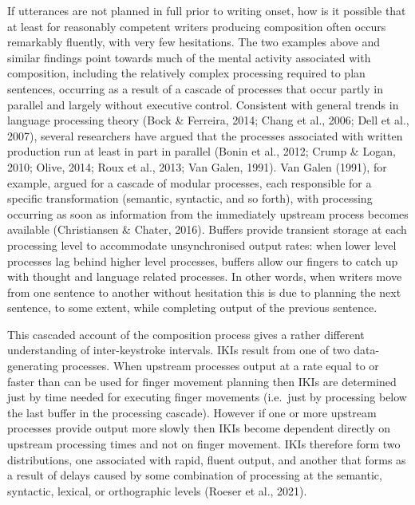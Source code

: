 \documentclass[
  english,
  man,floatsintext]{apa7}
\begin{document}
If utterances are not planned in full prior to writing onset, how is it possible that at least for reasonably competent writers producing composition often occurs remarkably fluently, with very few hesitations. The two examples above and similar findings point towards much of the mental activity associated with composition, including the relatively complex processing required to plan sentences, occurring as a result of a cascade of processes that occur partly in parallel and largely without executive control. Consistent with general trends in language processing theory (Bock \& Ferreira, 2014; Chang et al., 2006; Dell et al., 2007), several researchers have argued that the processes associated with written production run at least in part in parallel (Bonin et al., 2012; Crump \& Logan, 2010; Olive, 2014; Roux et al., 2013; Van Galen, 1991). Van Galen (1991), for example, argued for a cascade of modular processes, each responsible for a specific transformation (semantic, syntactic, and so forth), with processing occurring as soon as information from the immediately upstream process becomes available (Christiansen \& Chater, 2016). Buffers provide transient storage at each processing level to accommodate unsynchronised output rates: when lower level processes lag behind higher level processes, buffers allow our fingers to catch up with thought and language related processes. In other words, when writers move from one sentence to another without hesitation this is due to planning the next sentence, to some extent, while completing output of the previous sentence.

This cascaded account of the composition process gives a rather different understanding of inter-keystroke intervals. IKIs result from one of two data-generating processes. When upstream processes output at a rate equal to or faster than can be used for finger movement planning then IKIs are determined just by time needed for executing finger movements (i.e.~just by processing below the last buffer in the processing cascade). However if one or more upstream processes provide output more slowly then IKIs become dependent directly on upstream processing times and not on finger movement. IKIs therefore form two distributions, one associated with rapid, fluent output, and another that forms as a result of delays caused by some combination of processing at the semantic, syntactic, lexical, or orthographic levels (Roeser et al., 2021).
\end{document}
